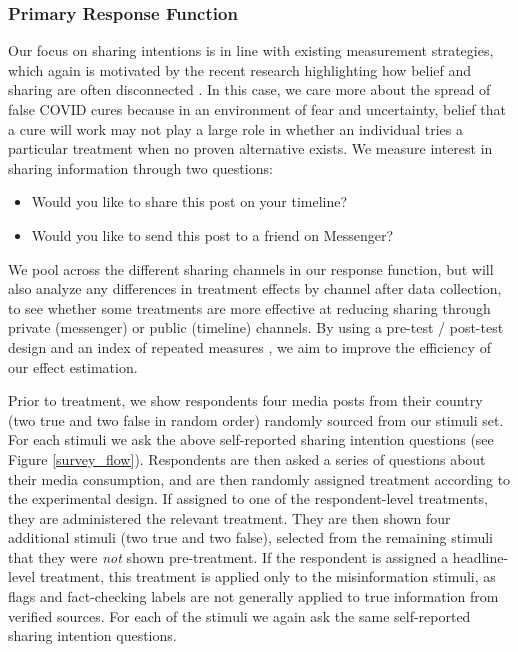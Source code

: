 \documentclass[letterpaper, 12pt, parskip=full,DIV=10]{scrartcl}
\begin{document}
\subsubsection{Primary Response Function}
{Our focus on sharing intentions is in line with existing measurement strategies, which again is motivated by the recent research highlighting how belief and sharing are often disconnected} \citep{pennycook2020fighting,pennycook_rand_2020}. {In this case, we care more about the spread of false COVID cures because in an environment of fear and uncertainty, belief that a cure will work may not play a large role in whether an individual tries a particular treatment when no proven alternative exists. } We measure interest in sharing information through two questions:
\begin{itemize}
\item Would you like to share this post on your timeline? 
\item Would you like to send this post to a friend on Messenger?
\end{itemize}


{We pool across the different sharing channels in our response function, but will also analyze any differences in treatment effects by channel after data collection, to see whether some treatments are more effective at reducing sharing through private (messenger) or public (timeline) channels.} By using a pre-test / post-test design  \citep{davidian2005semiparametric} %
and an index of repeated measures \citep{broockman2017design}, we aim to improve the efficiency of our effect estimation. 



Prior to treatment, we show respondents four media posts from their country (two true and two false in random order) randomly sourced from our stimuli set. For each stimuli we ask the above self-reported sharing intention questions (see Figure \ref{survey_flow}). Respondents are then asked a series of questions about their media consumption, and are then randomly assigned treatment according to the experimental design. If assigned to one of the respondent-level treatments, they are administered the relevant treatment. They are then shown four additional stimuli (two true and two false), selected from the remaining stimuli that they were \textit{not} shown pre-treatment. If the respondent is assigned a headline-level treatment, this treatment is applied only to the misinformation stimuli, as flags and fact-checking labels are not generally applied to true information from verified sources. For each of the stimuli we again ask the same self-reported sharing intention questions. 
\end{document}
